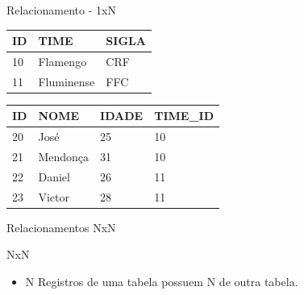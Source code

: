 \documentclass{beamer}
\begin{document}
\begin{frame}{Relacionamento - 1xN}
	\begin{center}
		\begin{table}
			\begin{tabular}{ l | l | l}
					\hline
					\hline
					\hline					
					\rowcolor{header-color} \color{white}\textbf{ID} & \color{white}\textbf{TIME}  & \color{white}\textbf{SIGLA} \\
					\hline
					\rowcolor{gray-one} 10 & Flamengo & CRF \\
					\hline
					\rowcolor{gray-two} 11 & Fluminense & FFC \\
					\hline
					\hline
			\end{tabular}%
		\end{table}
		\begin{table}
			\begin{tabular}{ l | l | l | l}
				\hline
				\hline
				\hline					
				\rowcolor{header-color} \color{white}\textbf{ID} & \color{white}\textbf{NOME}  & \color{white}\textbf{IDADE}  & \color{white}\textbf{TIME\_ID}\\
				\hline
				\rowcolor{gray-one} 20  & José & 25 & 10 \\
				\hline
				\rowcolor{gray-one}  21  & Mendonça & 31 & 10 \\
				\hline
				\rowcolor{gray-two} 22 & Daniel & 26 & 11 \\
				\hline
				\rowcolor{gray-two} 23 & Victor & 28 & 11 \\
				\hline
				\hline
			\end{tabular}%
		\end{table}
		
	\end{center}
\end{frame}

\begin{frame}{Relacionamentos NxN}
	\begin{block} {\LARGE NxN}
		\begin{itemize} \itemsep 2em
			\item{\LARGE N Registros de uma tabela possuem N de outra tabela.}
		\end{itemize}
	\end{block}
\end{frame}
\end{document}
